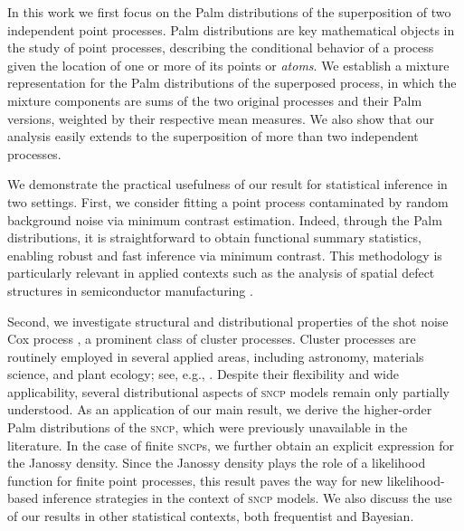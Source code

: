 \documentclass[11pt,a4paper,oneside]{article}
\theoremstyle{definition}
\theoremstyle{remark}
\begin{document}
In this work we first focus on the Palm distributions of the superposition of two independent point processes. Palm distributions \citep{BaBlaKa} are key mathematical objects in the study of point processes, describing the conditional behavior of a process given the location of one or more of its points or \emph{atoms}.
We establish a mixture representation for the Palm distributions of the superposed process, in which the mixture components are sums of the two original processes and their Palm versions, weighted by their respective mean measures.
We also show that our analysis easily extends to the superposition of more than two independent processes.


We demonstrate the practical usefulness of our result for statistical inference in two settings.
First, we consider fitting a point process contaminated by random background noise via minimum contrast estimation.
Indeed, through the Palm distributions, it is straightforward to obtain functional summary statistics, enabling robust and fast inference via minimum contrast. 
This methodology is particularly relevant in applied contexts such as the analysis of spatial defect structures in semiconductor manufacturing \citep{Borgons2021}.

Second, we investigate structural and distributional properties of the shot noise Cox process \citep[\textsc{sncp},][]{Mo03Cox}, a prominent class of cluster processes. Cluster processes are routinely employed in several applied areas, including astronomy, materials science, and plant ecology; see, e.g., \citet{Illian2008,MoWaBook03}. Despite their flexibility and wide applicability, several distributional aspects of \textsc{sncp} models remain only partially understood.
As an application of our main result, we derive the higher-order Palm distributions of the \textsc{sncp}, which were previously unavailable in the literature. In the case of finite \textsc{sncp}s, we further obtain an explicit expression for the Janossy density. Since the Janossy density plays the role of a likelihood function for finite point processes, this result paves the way for new likelihood-based inference strategies in the context of \textsc{sncp} models.
We also discuss the use of our results in other statistical contexts, both frequentist and Bayesian.



\end{document}
